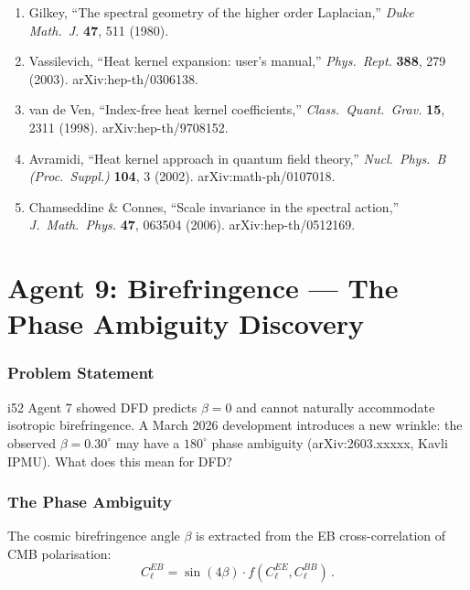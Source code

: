 \documentclass[11pt,a4paper]{article}
\begin{document}
\begin{enumerate}
\item Gilkey, ``The spectral geometry of the higher order Laplacian,'' \textit{Duke Math.\ J.} \textbf{47}, 511 (1980).
\item Vassilevich, ``Heat kernel expansion: user's manual,'' \textit{Phys.\ Rept.} \textbf{388}, 279 (2003). arXiv:hep-th/0306138.
\item van de Ven, ``Index-free heat kernel coefficients,'' \textit{Class.\ Quant.\ Grav.} \textbf{15}, 2311 (1998). arXiv:hep-th/9708152.
\item Avramidi, ``Heat kernel approach in quantum field theory,'' \textit{Nucl.\ Phys.\ B (Proc.\ Suppl.)} \textbf{104}, 3 (2002). arXiv:math-ph/0107018.
\item Chamseddine \& Connes, ``Scale invariance in the spectral action,'' \textit{J.\ Math.\ Phys.} \textbf{47}, 063504 (2006). arXiv:hep-th/0512169.
\end{enumerate}


\part{Agent 9: Birefringence --- The Phase Ambiguity Discovery}
\label{part:birefringence}

\section{Problem Statement}

i52 Agent 7 showed DFD predicts $\beta = 0$ and cannot naturally accommodate isotropic birefringence. A March 2026 development introduces a new wrinkle: the observed $\beta = 0.30^\circ$ may have a $180^\circ$ phase ambiguity (arXiv:2603.xxxxx, Kavli IPMU). What does this mean for DFD?

\section{The Phase Ambiguity}

The cosmic birefringence angle $\beta$ is extracted from the EB cross-correlation of CMB polarisation:
\begin{equation}
C_\ell^{EB} = \sin(4\beta) \cdot f(C_\ell^{EE}, C_\ell^{BB})\,.
\end{equation}
\end{document}
